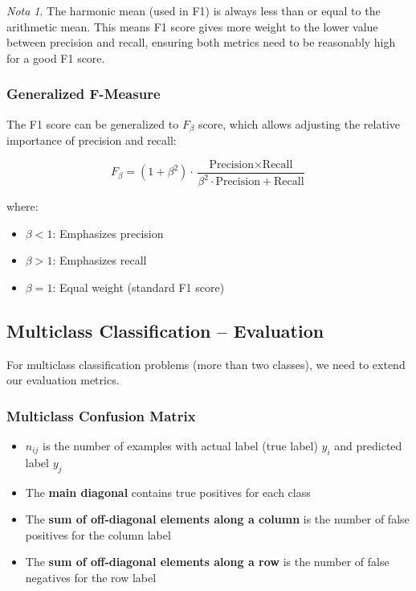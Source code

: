 \documentclass[11pt,a4paper]{article}
\theoremstyle{definition}
\theoremstyle{plain}
\theoremstyle{remark}
\newtheorem*{remark}{Nota}
\begin{document}
\begin{remark}
The harmonic mean (used in F1) is always less than or equal to the arithmetic mean. This means F1 score gives more weight to the lower value between precision and recall, ensuring both metrics need to be reasonably high for a good F1 score.
\end{remark}

\subsubsection{Generalized F-Measure}

The F1 score can be generalized to $F_\beta$ score, which allows adjusting the relative importance of precision and recall:

\begin{equation}
F_\beta = (1 + \beta^2) \cdot \frac{\text{Precision} \times \text{Recall}}{\beta^2 \cdot \text{Precision} + \text{Recall}}
\end{equation}

where:
\begin{itemize}
    \item $\beta < 1$: Emphasizes precision
    \item $\beta > 1$: Emphasizes recall
    \item $\beta = 1$: Equal weight (standard F1 score)
\end{itemize}

\subsection{Multiclass Classification -- Evaluation}

For multiclass classification problems (more than two classes), we need to extend our evaluation metrics.

\subsubsection{Multiclass Confusion Matrix}

\begin{itemize}
    \item $n_{ij}$ is the number of examples with actual label (true label) $y_i$ and predicted label $y_j$
    \item The \textbf{main diagonal} contains true positives for each class
    \item The \textbf{sum of off-diagonal elements along a column} is the number of false positives for the column label
    \item The \textbf{sum of off-diagonal elements along a row} is the number of false negatives for the row label
\end{itemize}
\end{document}
